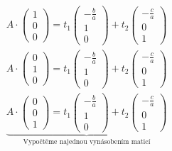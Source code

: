\documentclass[12pt]{article}
\begin{document}
    \begin{align*}
      A \cdot \left(\begin{array}{c} 1 \\ 0 \\ 0 \end{array}\right)
        = t_1 \left(\begin{array}{c} -\frac{b}{a}\\1\\0 \end{array}\right) + t_2 \left(\begin{array}{c} -\frac{c}{a}\\0\\1 \end{array}\right) \\
      A \cdot \left(\begin{array}{c} 0 \\ 1 \\ 0 \end{array}\right)
        = t_1 \left(\begin{array}{c} -\frac{b}{a}\\1\\0 \end{array}\right) + t_2 \left(\begin{array}{c} -\frac{c}{a}\\0\\1 \end{array}\right) \\
      \underbrace{A \cdot \left(\begin{array}{c} 0 \\ 0 \\ 1 \end{array}\right)
        = t_1 \left(\begin{array}{c} -\frac{b}{a}\\1\\0 \end{array}\right) + t_2 \left(\begin{array}{c} -\frac{c}{a}\\0\\1 \end{array}\right) }
        _{\text{Vypočtěme najednou vynásobením maticí}}
    \end{align*}
\end{document}
